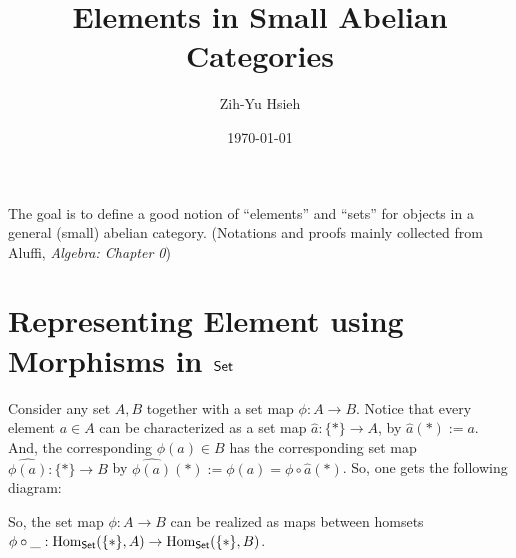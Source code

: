 \documentclass{article}
\title{Elements in Small Abelian Categories}
\author{Zih-Yu Hsieh}
\date{\today}
\begin{document}
\maketitle

The goal is to define a good notion of ``elements'' and ``sets'' for objects in a general (small) abelian category. (Notations and proofs mainly collected from Aluffi, \textit{Algebra: Chapter 0})

\section{Representing Element using Morphisms in $\mathsf{Set}$}

Consider any set $A,B$ together with a set map $\phi:A \rightarrow B$. Notice that every element $a \in A$ can be characterized as a set map $\hat{a}:\{*\}\rightarrow A$, by $\hat{a}(*):= a$. And, the corresponding $\phi(a) \in B$ has the corresponding set map $\hat{\phi(a)}:\{*\}\rightarrow B$ by $\hat{\phi(a)}(*) := \phi(a) = \phi \circ \hat{a}(*)$. So, one gets the following diagram:

\begin{center}
\end{center}

So, the set map $\phi:A\rightarrow B$ can be realized as maps between homsets $\phi\circ \_:\mathrm{Hom}_{\mathsf{Set}}(\{*\}, A)\rightarrow\mathrm{Hom}_{\mathsf{Set}}(\{*\},B)$.
\end{document}
